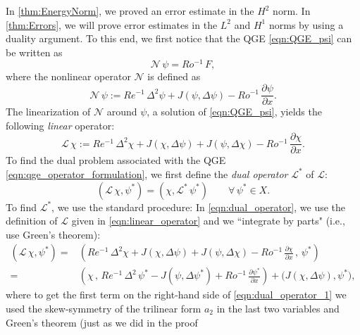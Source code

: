 In \autoref{thm:EnergyNorm}, we proved an error estimate in the $H^2$ norm.
In \autoref{thm:Errors}, we will prove error estimates in the $L^2$ and $H^1$
norms by using a duality argument. To this end, we first notice that the QGE
\eqref{eqn:QGE_psi} can be written as
\begin{equation}
  \mathcal{N} \, \psi = Ro^{-1} \, F ,
  \label{eqn:qge_operator_formulation}
\end{equation}
where the nonlinear operator $\mathcal{N}$ is defined as
\begin{equation}
  \mathcal{N} \, \psi := Re^{-1} \, \Delta^2 \psi + J(\psi , \Delta \psi)
    - Ro^{-1} \, \frac{\partial \psi}{\partial x} .
  \label{eqn:nonlinear_operator}
\end{equation}
The linearization of $\mathcal{N}$ around $\psi$, a solution of
\eqref{eqn:QGE_psi}, yields the following \emph{linear} operator:
\begin{equation}
  \mathcal{L} \, \chi := Re^{-1} \, \Delta^2 \chi + J(\chi , \Delta \psi) +
    J(\psi, \Delta \chi) - Ro^{-1} \, \frac{\partial \chi}{\partial x} .
  \label{eqn:linear_operator}
\end{equation}
To find the dual problem associated with the QGE
\eqref{eqn:qge_operator_formulation}, we first define the \emph{dual operator}
$\mathcal{L}^*$ of $\mathcal{L}$:
\begin{equation}
  (\mathcal{L} \, \chi , \psi^*) = ( \chi , \mathcal{L}^* \, \psi^*)
    \qquad \forall \, \psi^* \in X .
  \label{eqn:dual_operator}
\end{equation}
To find $\mathcal{L}^*$, we use the standard procedure:
In \eqref{eqn:dual_operator}, we use the definition of $\mathcal{L}$ given in \eqref{eqn:linear_operator} and we ``integrate by parts" (i.e., use Green's theorem):
\begin{align}
  (\mathcal{L} \, \chi , \psi^*) =& \left( Re^{-1} \, \Delta^2 \chi
    + J(\chi , \Delta \psi) + J(\psi, \Delta \chi)
    - Ro^{-1} \, \frac{\partial \chi}{\partial x} \, , \, \psi^* \right) \nonumber \\
  =& \left( \chi \, , \, Re^{-1} \, \Delta^2 \, \psi^* - J(\psi , \Delta \psi^* )
    + Ro^{-1} \, \frac{\partial \psi^*}{\partial x} \right)
    + \biggl( J(\chi , \Delta \psi) , \psi^* \biggr) ,
  \label{eqn:dual_operator_1}
\end{align}
where to get the first term on the right-hand side of
\eqref{eqn:dual_operator_1} we used the skew-symmetry of the trilinear form
$a_2$ in the last two variables and Green's theorem (just as we did in the proof
